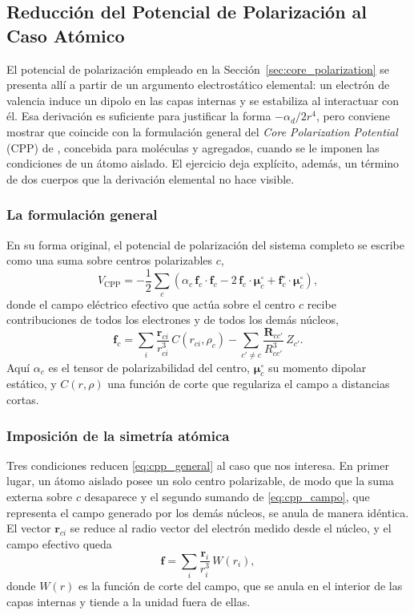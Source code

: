 \subsection{Reducción del Potencial de Polarización al Caso Atómico}
\label{sec:cpp-muller}

El potencial de polarización empleado en la Sección~\ref{sec:core_polarization} se presenta allí a partir de un argumento electrostático elemental: un electrón de valencia induce un dipolo en las capas internas y se estabiliza al interactuar con él. Esa derivación es suficiente para justificar la forma $-\alpha_d/2r^4$, pero conviene mostrar que coincide con la formulación general del \textit{Core Polarization Potential} (CPP) de \textcite{Muller1984}, concebida para moléculas y agregados, cuando se le imponen las condiciones de un átomo aislado. El ejercicio deja explícito, además, un término de dos cuerpos que la derivación elemental no hace visible.

\subsubsection{La formulación general}

En su forma original, el potencial de polarización del sistema completo se escribe como una suma sobre centros polarizables $c$,
\begin{equation}
    \label{eq:cpp_general}
    V_{\text{CPP}} = -\frac{1}{2}\sum_c \left( \alpha_c\, \bm{f}_c \cdot \bm{f}_c - 2\,\bm{f}_c \cdot \bm{\mu}_c^{\circ} + \bm{f}_c^{\circ}\cdot\bm{\mu}_c^{\circ} \right),
\end{equation}
donde el campo eléctrico efectivo que actúa sobre el centro $c$ recibe contribuciones de todos los electrones y de todos los demás núcleos,
\begin{equation}
    \label{eq:cpp_campo}
    \bm{f}_c = \sum_i \frac{\bm{r}_{ci}}{r_{ci}^3}\,C(r_{ci}, \rho_c) - \sum_{c' \neq c} \frac{\bm{R}_{cc'}}{R_{cc'}^3}\,Z_{c'} .
\end{equation}
Aquí $\alpha_c$ es el tensor de polarizabilidad del centro, $\bm{\mu}_c^{\circ}$ su momento dipolar estático, y $C(r,\rho)$ una función de corte que regulariza el campo a distancias cortas.

\subsubsection{Imposición de la simetría atómica}

Tres condiciones reducen \eqref{eq:cpp_general} al caso que nos interesa. En primer lugar, un átomo aislado posee un solo centro polarizable, de modo que la suma externa sobre $c$ desaparece y el segundo sumando de \eqref{eq:cpp_campo}, que representa el campo generado por los demás núcleos, se anula de manera idéntica. El vector $\bm{r}_{ci}$ se reduce al radio vector del electrón medido desde el núcleo, y el campo efectivo queda
\begin{equation}
    \label{eq:cpp_campo_atomico}
    \bm{f} = \sum_i \frac{\bm{r}_i}{r_i^3}\,W(r_i),
\end{equation}
donde $W(r)$ es la función de corte del campo, que se anula en el interior de las capas internas y tiende a la unidad fuera de ellas.


